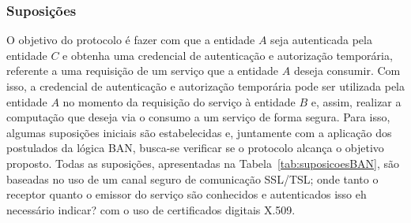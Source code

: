 \subsubsection{Suposições}\label{sec:Suposicoes}

O objetivo do protocolo é fazer com que a entidade ${A}$ seja autenticada pela entidade ${C}$ e obtenha uma credencial de autenticação e autorização temporária, referente a uma requisição de um serviço que a entidade ${A}$ deseja consumir. Com isso, a credencial de autenticação e autorização temporária pode ser utilizada pela entidade ${A}$ no momento da requisição do serviço \`{a} entidade ${B}$ e, assim, realizar a computa\c c\~{a}o que deseja via o consumo a um servi\c co de forma segura. Para isso, algumas suposições iniciais são estabelecidas e, juntamente com a aplicação  dos postulados da lógica BAN, busca-se verificar se o protocolo alcan\c ca o objetivo proposto. Todas as suposições, apresentadas na Tabela~\ref{tab:suposicoesBAN}, são baseadas no uso de um canal seguro de comunicação SSL/TSL; onde tanto o receptor  quanto o emissor do serviço são conhecidos e 
autenticados {\color{blue}isso eh necess\'{a}rio indicar?} com o uso de certificados digitais X.509.

